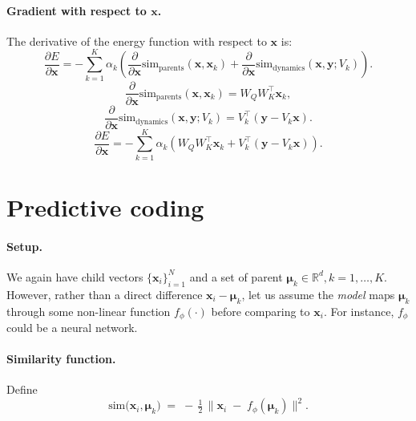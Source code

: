 \documentclass{article}
\begin{document}
\paragraph{Gradient with respect to \(\bm{x}\).} 
The derivative of the energy function with respect to \(\bm{x}\) is:
\begin{equation}
    \frac{\partial E}{\partial \bm{x}} = -\sum_{k=1}^K \alpha_k \left( \frac{\partial}{\partial \bm{x}} \mathrm{sim}_{\text{parents}}(\bm{x}, \bm{x}_k) + \frac{\partial}{\partial \bm{x}} \mathrm{sim}_{\text{dynamics}}(\bm{x}, \bm{y}; V_k) \right).
\end{equation}
\begin{equation}
    \frac{\partial}{\partial \bm{x}} \mathrm{sim}_{\text{parents}}(\bm{x}, \bm{x}_k) = W_Q W_K^\top \bm{x}_k,
\end{equation}
\begin{equation}
    \frac{\partial}{\partial \bm{x}} \mathrm{sim}_{\text{dynamics}}(\bm{x}, \bm{y}; V_k) = V_k^\top (\bm{y} - V_k \bm{x}).
\end{equation}
\begin{equation}
    \frac{\partial E}{\partial \bm{x}} = -\sum_{k=1}^K \alpha_k \left( W_Q W_K^\top \bm{x}_k + V_k^\top (\bm{y} - V_k \bm{x}) \right).
\end{equation}



\section{Predictive coding}

\paragraph{Setup.}
We again have child vectors \(\{\bm{x}_i\}_{i=1}^N\) and a set of parent \(\bm{\mu}_k \in \mathbb{R}^d, k=1,\dots,K\).  However, rather than a direct difference \(\bm{x}_i-\bm{\mu}_k\), let us assume the \emph{model} maps \(\bm{\mu}_k\) through some non-linear function \(f_\phi(\cdot)\) before comparing to \(\bm{x}_i\).  For instance, \(f_\phi\) could be a neural network.

\paragraph{Similarity function.}
Define
\[
\mathrm{sim}\bigl(\bm{x}_i,\bm{\mu}_k\bigr)
\;=\;
-\,\tfrac12\,
\bigl\|\bm{x}_i \;-\; f_\phi(\bm{\mu}_k)\bigr\|^2.
\]
\end{document}
